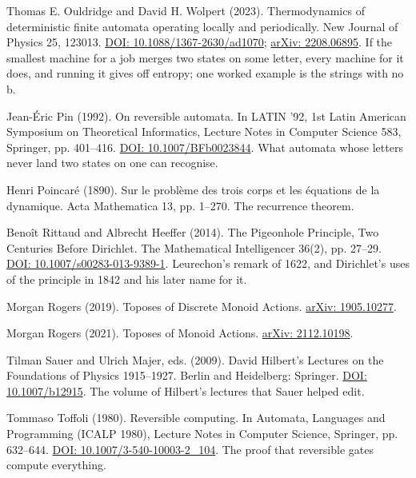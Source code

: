 \noindent Thomas E. Ouldridge and David H. Wolpert (2023). Thermodynamics of deterministic finite automata operating locally and periodically. New Journal of Physics 25, 123013. \href{https://doi.org/10.1088/1367-2630/ad1070}{DOI: 10.1088/1367-2630/ad1070}; \href{https://arxiv.org/abs/2208.06895}{arXiv: 2208.06895}. If the smallest machine for a job merges two states on some letter, every machine for it does, and running it gives off entropy; one worked example is the strings with no b.
\par\medskip

\noindent Jean-\'Eric Pin (1992). On reversible automata. In LATIN '92, 1st Latin American Symposium on Theoretical Informatics, Lecture Notes in Computer Science 583, Springer, pp. 401--416. \href{https://doi.org/10.1007/BFb0023844}{DOI: 10.1007/BFb0023844}. What automata whose letters never land two states on one can recognise.
\par\medskip

\noindent Henri Poincar\'e (1890). Sur le probl\`eme des trois corps et les \'equations de la dynamique. Acta Mathematica 13, pp. 1--270. The recurrence theorem.
\par\medskip

\noindent Beno\^it Rittaud and Albrecht Heeffer (2014). The Pigeonhole Principle, Two Centuries Before Dirichlet. The Mathematical Intelligencer 36(2), pp. 27--29. \href{https://doi.org/10.1007/s00283-013-9389-1}{DOI: 10.1007/s00283-013-9389-1}. Leurechon's remark of 1622, and Dirichlet's uses of the principle in 1842 and his later name for it.
\par\medskip

\noindent Morgan Rogers (2019). Toposes of Discrete Monoid Actions. \href{https://arxiv.org/abs/1905.10277}{arXiv: 1905.10277}.
\par\medskip

\noindent Morgan Rogers (2021). Toposes of Monoid Actions. \href{https://arxiv.org/abs/2112.10198}{arXiv: 2112.10198}.
\par\medskip

\noindent Tilman Sauer and Ulrich Majer, eds. (2009). David Hilbert's Lectures on the Foundations of Physics 1915--1927. Berlin and Heidelberg: Springer. \href{https://doi.org/10.1007/b12915}{DOI: 10.1007/b12915}. The volume of Hilbert's lectures that Sauer helped edit.
\par\medskip

\noindent Tommaso Toffoli (1980). Reversible computing. In Automata, Languages and Programming (ICALP 1980), Lecture Notes in Computer Science, Springer, pp. 632--644. \href{https://doi.org/10.1007/3-540-10003-2_104}{DOI: 10.1007/3-540-10003-2\_104}. The proof that reversible gates compute everything.
\par\medskip

